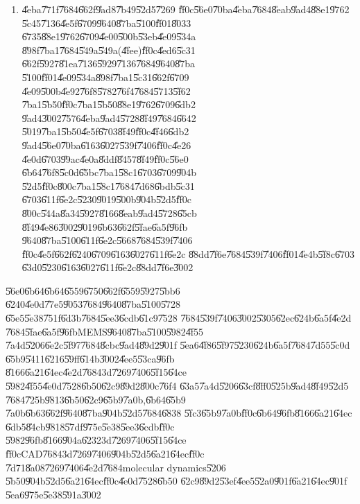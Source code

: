 \documentclass[12pt,a4paper]{article}
\begin{document}
\begin{enumerate}
\item \U{4eba}\U{771f}\U{7684}\U{662f}\U{9ad8}\U{7b49}\U{52d5}\U{7269}%
\U{ff0c}\U{56e0}\U{70ba}\U{4eba}\U{7684}\U{8eab}\U{9ad4}\U{88e1}\U{9762}%
\U{5c45}\U{7136}\U{4e5f}\U{6709}\U{9640}\U{87ba}\U{5100}\U{ff01}\U{8033}%
\U{6735}\U{88e1}\U{9762}\U{6709}\U{4e00}\U{500b}\U{53eb}\U{4e09}\U{534a}%
\U{898f}\U{7ba1}\U{7684}\U{549a}\U{549a}(\U{4fee})\U{ff0c}\U{4ed6}\U{5c31}%
\U{662f}\U{5927}\U{81ea}\U{7136}\U{5929}\U{7136}\U{7684}\U{9640}\U{87ba}%
\U{5100}\U{ff01}\U{4e09}\U{534a}\U{898f}\U{7ba1}\U{5c31}\U{662f}\U{6709}%
\U{4e09}\U{500b}\U{4e92}\U{76f8}\U{5782}\U{76f4}\U{7684}\U{5713}\U{5f62}%
\U{7ba1}\U{5b50}\U{ff0c}\U{7ba1}\U{5b50}\U{88e1}\U{9762}\U{6709}\U{6db2}%
\U{9ad4}\U{3002}\U{7576}\U{4eba}\U{9ad4}\U{5728}\U{8f49}\U{7684}\U{6642}%
\U{5019}\U{7ba1}\U{5b50}\U{4e5f}\U{6703}\U{8f49}\U{ff0c}\U{4f46}\U{6db2}%
\U{9ad4}\U{56e0}\U{70ba}\U{6163}\U{6027}\U{539f}\U{7406}\U{ff0c}\U{4e26}%
\U{4e0d}\U{6703}\U{99ac}\U{4e0a}\U{8ddf}\U{8457}\U{8f49}\U{ff0c}\U{56e0}%
\U{6b64}\U{76f8}\U{5c0d}\U{65bc}\U{7ba1}\U{58c1}\U{6703}\U{6709}\U{904b}%
\U{52d5}\U{ff0c}\U{800c}\U{7ba1}\U{58c1}\U{7684}\U{7d68}\U{6bdb}\U{5c31}%
\U{6703}\U{611f}\U{6e2c}\U{5230}\U{9019}\U{500b}\U{904b}\U{52d5}\U{ff0c}%
\U{800c}\U{544a}\U{8a34}\U{5927}\U{8166}\U{8eab}\U{9ad4}\U{5728}\U{65cb}%
\U{8f49}\U{4e86}\U{3002}\U{9019}\U{6b63}\U{662f}\U{5fae}\U{6a5f}\U{96fb}%
\U{9640}\U{87ba}\U{5100}\U{611f}\U{6e2c}\U{5668}\U{7684}\U{539f}\U{7406}%
\U{ff0c}\U{4e5f}\U{662f}\U{6240}\U{6709}\U{6163}\U{6027}\U{611f}\U{6e2c}%
\U{88dd}\U{7f6e}\U{7684}\U{539f}\U{7406}\U{ff01}\U{4e4b}\U{5f8c}\U{6703}%
\U{63d0}\U{5230}\U{6163}\U{6027}\U{611f}\U{6e2c}\U{88dd}\U{7f6e}\U{3002}
\end{enumerate}

\U{56e0}\U{6b64}\U{6b64}\U{6559}\U{6750}\U{662f}\U{6559}\U{5927}\U{5bb6}%
\U{6240}\U{4e0d}\U{77e5}\U{9053}\U{7684}\U{9640}\U{87ba}\U{5100}\U{5728}%
\U{65e5}\U{5e38}\U{751f}\U{6d3b}\U{7684}\U{5ee3}\U{6cdb}\U{61c9}\U{7528}%
\U{7684}\U{539f}\U{7406}\U{3002}\U{5305}\U{62ec}\U{624b}\U{6a5f}\U{4e2d}%
\U{7684}\U{5fae}\U{6a5f}\U{96fb}MEMS\U{9640}\U{87ba}\U{5100}\U{5982}\U{4f55}%
\U{7a4d}\U{5206}\U{6e2c}\U{5f97}\U{7684}\U{8cbc}\U{9ad4}\U{89d2}\U{901f}%
\U{5ea6}\U{4f86}\U{5f97}\U{5230}\U{624b}\U{6a5f}\U{7684}\U{7d55}\U{5c0d}%
\U{65b9}\U{5411}\U{6216}\U{59ff}\U{614b}\U{3002}\U{4ee5}\U{53ca}\U{96fb}%
\U{8166}\U{6a21}\U{64ec}\U{4e2d}\U{7684}3d\U{7269}\U{7406}\U{5f15}\U{64ce}%
\U{5982}\U{4f55}\U{4e0d}\U{7528}\U{6b50}\U{62c9}\U{89d2}\U{800c}\U{76f4}%
\U{63a5}\U{7a4d}\U{5206}\U{63cf}\U{8ff0}\U{525b}\U{9ad4}\U{8f49}\U{52d5}%
\U{7684}\U{725b}\U{9813}\U{6b50}\U{62c9}\U{65b9}\U{7a0b},\U{6b64}\U{65b9}%
\U{7a0b}\U{6b63}\U{662f}\U{9640}\U{87ba}\U{904b}\U{52d5}\U{7684}\U{6838}%
\U{5fc3}\U{65b9}\U{7a0b}\U{ff0c}\U{6b64}\U{96fb}\U{8166}\U{6a21}\U{64ec}%
\U{6db5}\U{84cb}\U{9818}\U{57df}\U{975e}\U{5e38}\U{5ee3}\U{6cdb}\U{ff0c}%
\U{5982}\U{96fb}\U{8166}\U{904a}\U{6232}3d\U{7269}\U{7406}\U{5f15}\U{64ce}%
\U{ff0c}CAD\U{7684}3d\U{7269}\U{7406}\U{904b}\U{52d5}\U{6a21}\U{64ec}\U{ff0c}%
\U{7d71}\U{8a08}\U{7269}\U{7406}\U{4e2d}\U{7684}molecular dynamics\U{5206}%
\U{5b50}\U{904b}\U{52d5}\U{6a21}\U{64ec}\U{ff0c}\U{4e0d}\U{7528}\U{6b50}%
\U{62c9}\U{89d2}\U{53ef}\U{4ee5}\U{52a0}\U{901f}\U{6a21}\U{64ec}\U{901f}%
\U{5ea6}\U{975e}\U{5e38}\U{591a}\U{3002}
\end{document}
